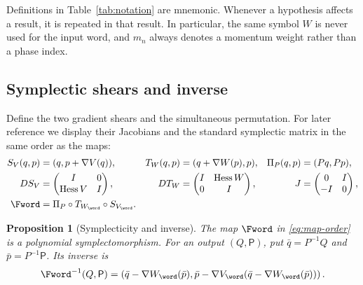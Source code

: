 \documentclass[11pt,letterpaper]{article}
\newtheorem{proposition}[theorem]{Proposition}
\theoremstyle{definition}
\theoremstyle{remark}
\numberwithin{equation}{section}
\begin{document}
Definitions in Table~\ref{tab:notation} are mnemonic.  Whenever a
hypothesis affects a result, it is repeated in that result.  In particular,
the same symbol \(W\) is never used for the input word, and \(m_n\) always
denotes a momentum weight rather than a phase index.

\subsection{Symplectic shears and inverse}

Define the two gradient shears and the simultaneous permutation.  For later
reference we display their Jacobians and the standard symplectic matrix in
the same order as the maps:
\begin{align}
 S_V(q,p)&=(q,p+\nabla V(q)),&
 T_W(q,p)&=(q+\nabla W(p),p),&
 \Pi_P(q,p)&=(Pq,Pp),
 \label{eq:shears}\\
 DS_V&=\begin{pmatrix}I&0\\ \operatorname{Hess}V&I\end{pmatrix},&
 DT_W&=\begin{pmatrix}I&\operatorname{Hess}W\\0&I\end{pmatrix},&
 J&=\begin{pmatrix}0&I\\-I&0\end{pmatrix},
 \notag\\
 \Fword&=\Pi_P\circ T_{W_{\word}}\circ S_{V_{\word}}.
 \label{eq:map-order}
\end{align}

\begin{proposition}[Symplecticity and inverse]
\label{prop:symplectic-inverse}
The map \(\Fword\) in \eqref{eq:map-order} is a polynomial
symplectomorphism.  For an output \((Q,\mathsf P)\), put
\(\bar q=P^{-1}Q\) and \(\bar p=P^{-1}\mathsf P\).  Its inverse is
\begin{equation}
 \Fword^{-1}(Q,\mathsf P)=
 \left(
  \bar q-\nabla W_{\word}(\bar p),
  \bar p-\nabla V_{\word}
     (\bar q-\nabla W_{\word}(\bar p))
 \right).
 \label{eq:inverse}
\end{equation}
\end{proposition}
\end{document}
